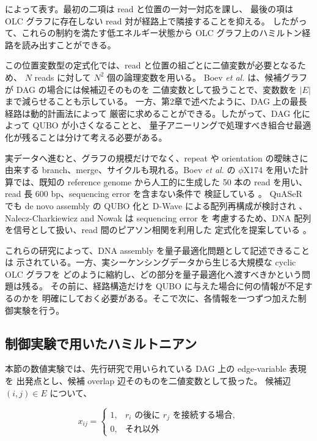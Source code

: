 \documentclass[a4j,10pt]{ujarticle}
\begin{document}
によって表す。最初の二項は read と位置の一対一対応を課し、
最後の項は OLC グラフに存在しない read 対が経路上で隣接することを抑える。
したがって、これらの制約を満たす低エネルギー状態から
OLC グラフ上のハミルトン経路を読み出すことができる。

この位置変数型の定式化では、read と位置の組ごとに二値変数が必要となるため、
$N$ reads に対して $N^2$ 個の論理変数を用いる。
Boev \textit{et al.} は、候補グラフが DAG の場合には候補辺そのものを
二値変数として扱うことで、変数数を $|E|$ まで減らせることも示している。
一方、第2章で述べたように、DAG 上の最長経路は動的計画法によって
厳密に求めることができる。したがって、DAG 化によって QUBO が小さくなることと、
量子アニーリングで処理すべき組合せ最適化が残ることは分けて考える必要がある。

実データへ進むと、グラフの規模だけでなく、repeat や orientation の曖昧さに由来する
branch、merge、サイクルも現れる。Boev \textit{et al.} の
$\phi$X174 を用いた計算では、既知の reference genome から人工的に生成した
50 本の read を用い、read 長 600 bp、sequencing error を含まない条件で
検証している \cite{boev2021genome}。
QuASeR でも de novo assembly の QUBO 化と D-Wave による配列再構成が検討され
\cite{sarkar2021quaser}、Nalecz-Charkiewicz and Nowak は sequencing error を
考慮するため、DNA 配列を信号として扱い、read 間のピアソン相関を利用した
定式化を提案している \cite{nalecz2022assembly}。

これらの研究によって、DNA assembly を量子最適化問題として記述できることは
示されている。一方、実シーケンシングデータから生じる大規模な cyclic OLC グラフを
どのように縮約し、どの部分を量子最適化へ渡すべきかという問題は残る。
その前に、経路構造だけを QUBO に与えた場合に何の情報が不足するのかを
明確にしておく必要がある。そこで次に、各情報を一つずつ加えた制御実験を行う。


\subsection{制御実験で用いたハミルトニアン}

本節の数値実験では、先行研究で用いられている DAG 上の edge-variable 表現を
出発点とし、候補 overlap 辺そのものを二値変数として扱った。
候補辺 $(i,j)\in E$ について、

\[
x_{ij}
=
\begin{cases}
1, & r_i\text{ の後に }r_j\text{ を接続する場合},\\
0, & \text{それ以外}
\end{cases}
\]
\end{document}
